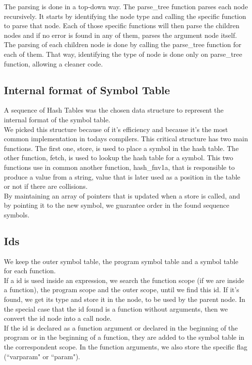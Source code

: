 \documentclass[12pt]{article}
\begin{document}
The parsing is done in a top-down way. The parse\_tree function parses each node recursively. It starts by identifying the node type and calling the specific function to parse that node. Each of those specific functions will then parse the children nodes and if no error is found in any of them, parses the argument node itself. The parsing of each children node is done by calling the parse\_tree function for each of them. That way, identifying the type of node is done only on parse\_tree function, allowing a cleaner code.\\

\subsection{Internal format of Symbol Table}

A sequence of Hash Tables was the chosen data structure to represent the internal format of the symbol table. \\
We picked this structure because of it's efficiency and because it's the most common implementation in todays compilers. This critical structure has two main functions. The first one, store, is used to place a symbol in the hash table. The other function, fetch, is used to lookup the hash table for a symbol. This two functions use in common another function, hash\_fnv1a, that is responsible to produce a value from a string, value that is later used as a position in the table or not if there are collisions. \\
By maintaining an array of pointers that is updated when a store is called, and by pointing it to the new symbol, we guarantee order in the found sequence symbols. \\

\subsection{Ids}

We keep the outer symbol table, the program symbol table and a symbol table for each function. \\
If a id is used inside an expression, we search the function scope (if we are inside a function), the program scope and the outer scope, until we find this id. If it's found, we get its type and store it in the node, to be used by the parent node. In the special case that the id found is a function without arguments, then we convert the id node into a call node. \\
If the id is declared as a function argument or declared in the beginning of the program or in the beginning of a function, they are added to the symbol table in the correspondent scope. In the function arguments, we also store the specific flag (``varparam" or ``param").
\end{document}
